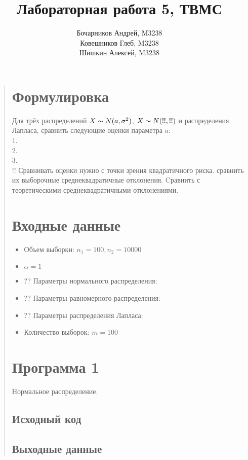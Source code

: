 \documentclass{article}
\begin{document}
\title{Лабораторная работа 5, ТВМС}
\author{
	Бочарников Андрей, M3238\\
	Ковешников Глеб, M3238\\
	Шишкин Алексей, M3238
}
\maketitle

\begin{quote}
\section{Формулировка}
	Для трёх распределений $X \thicksim N(a, \sigma^2)$, $X \thicksim N(!!, !!)$ и распределения Лапласа, сравнить следующие оценки параметра $a$:\\
	1. \\
	2. \\
	3. \\
	!! Сравнивать оценки нужно с точки зрения квадратичного риска. сравнить их выборочные среднеквадратичные отклонения. Cравнить с теоретическими среднеквадратичными отклонениями.
\section{Входные данные}
        \begin{itemize}
            \item Объем выборки: $n_1 = 100, n_2 = 10000$
            \item $\alpha = 1$
	    \item ?? Параметры нормального распределения:
	    \item ?? Параметры равномерного распределения:
	    \item ?? Параметры распределения Лапласа: 
	    \item Количество выборок: $m = 100$
        \end{itemize}
\section{Программа 1}	
        Нормальное распределение. \\
\subsection{Исходный код}
	
\subsection{Выходные данные}


\end{quote}
\end{document}
